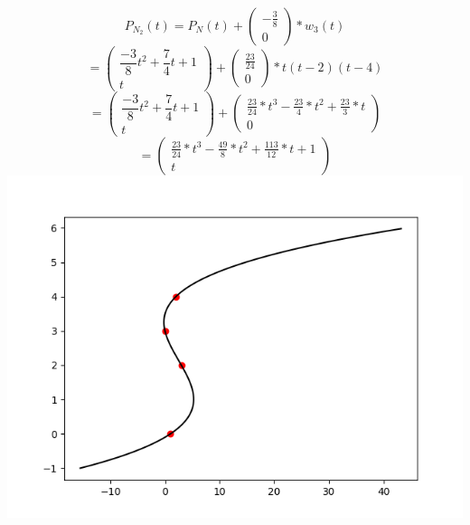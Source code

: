 \begin{tikzpicture}[grow=left,
level 1/.style={sibling distance=15mm},edge from parent/.style={-,draw},>=latex, level 3/.style={edge from child/.style={->,draw},sibling distance=15mm}]
\end{tikzpicture}\\

$$P_{N_2}(t) = P_{N}(t) + \begin{pmatrix}-\frac{3}{8}\\0\end{pmatrix} * w_3(t)$$
$$= \begin{pmatrix}\dfrac{-3}{8}t^2 +\dfrac{7}{4}t + 1\\t\end{pmatrix} + \begin{pmatrix}\frac{23}{24}\\0\end{pmatrix} * t(t-2)(t-4)$$
$$= \begin{pmatrix}\dfrac{-3}{8}t^2 +\dfrac{7}{4}t + 1\\t\end{pmatrix} + \begin{pmatrix}\frac{23}{24} * t^3 - \frac{23}{4} * t^2 + \frac{23}{3} * t\\0\end{pmatrix} $$
$$= \begin{pmatrix}\frac{23}{24} * t^3 - \frac{49}{8} * t^2 + \frac{113}{12} * t + 1\\t\end{pmatrix}$$
\includegraphics[width=\linewidth]{1d}